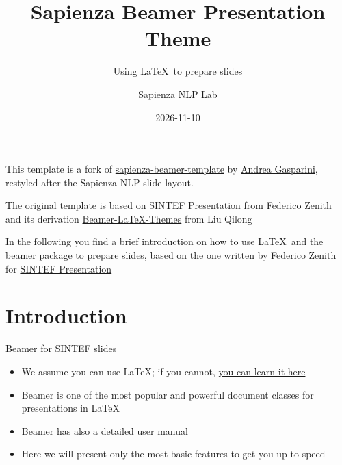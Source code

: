 \documentclass{beamer}
\title{Sapienza Beamer Presentation Theme}
\subtitle{Using \LaTeX\ to prepare slides}
\author{Sapienza NLP Lab}
\date{2026-11-10}
\newcommand{\hrefcol}[2]{\textcolor{cyan}{\href{#1}{#2}}}
\begin{document}
\maketitle

\begin{frame}

This template is a fork of \hrefcol{https://github.com/andrea-gasparini/sapienza-beamer-template}{sapienza-beamer-template} by \hrefcol{mailto:andrea@gasparini.cloud}{Andrea Gasparini}, restyled after the Sapienza NLP slide layout.

\vspace{\baselineskip}

The original template is based on \hrefcol{https://www.overleaf.com/latex/templates/sintef-presentation/jhbhdffczpnx}{SINTEF Presentation} from \hrefcol{mailto:federico.zenith@sintef.no}{Federico Zenith} and its derivation \hrefcol{https://github.com/TOB-KNPOB/Beamer-LaTeX-Themes}{Beamer-LaTeX-Themes} from Liu Qilong

\vspace{\baselineskip}

In the following you find a brief introduction on how to use \LaTeX\ and the beamer package to prepare slides, based on the one written by \hrefcol{mailto:federico.zenith@sintef.no}{Federico Zenith} for \hrefcol{https://www.overleaf.com/latex/templates/sintef-presentation/jhbhdffczpnx}{SINTEF Presentation}


\end{frame}

\section{Introduction}

\begin{frame}{Beamer for SINTEF slides}
\begin{itemize}
\item We assume you can use \LaTeX; if you cannot,
\hrefcol{http://en.wikibooks.org/wiki/LaTeX/}{you can learn it here}
\item Beamer is one of the most popular and powerful document
classes for presentations in \LaTeX
\item Beamer has also a detailed
\hrefcol{http://www.ctan.org/tex-archive/macros/latex/contrib/beamer/doc/beameruserguide.pdf}{user
 manual}
\item Here we will present only the most basic features to get you up to speed
\end{itemize}
\end{frame}
\end{document}

